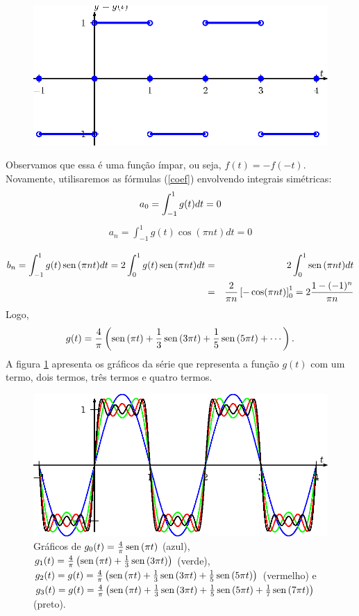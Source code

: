 \begin{ex}
\begin{figure}[!ht]
\begin{center}
\includegraphics{cap_series/pics/figura_3}\end{center}
\end{figure}
Observamos que essa é uma função ímpar, ou seja, $f(t)=-f(-t)$. Novamente, utilisaremos as fórmulas (\ref{coef}) envolvendo integrais simétricas:
  \begin{equation*}
   a_0= \int_{-1}^{1} g(t) dt=0\\
	\end{equation*}
	\begin{eqnarray*}
   a_n=  \int_{-1}^{1} g(t)\cos(\pi n t)dt=0\\
	 \end{eqnarray*}
	\begin{eqnarray*}
   b_n=\int_{-1}^{1} g(t)\operatorname{sen}\,(\pi n t)dt=2\int_{0}^{1} g(t)\operatorname{sen}\,(\pi n t)dt&=&2\int_{0}^{1} \operatorname{sen}\,(\pi n t)dt\\
	&=&\frac{2}{\pi n}\left[-\cos(\pi n t)\right]_0^1=2\frac{1-(-1)^n}{\pi n}
  \end{eqnarray*}
Logo,
$$
g(t)=\frac{4}{\pi}\left(\operatorname{sen}\,(\pi t)+\frac{1}{3}\operatorname{sen}\,(3\pi t)+\frac{1}{5}\operatorname{sen}\,(5\pi t)+\cdots\right).
$$
A figura \ref{fig_conv_quadrangular} apresenta os gráficos da série que representa a função $g(t)$ com um termo, dois termos, três termos e quatro termos.
\begin{figure}[!ht]
\begin{center}

\includegraphics{cap_series/pics/figura_4}\end{center}
\caption{\label{fig_conv_quadrangular}Gráficos de $g_0(t)=\frac{4}{\pi}\operatorname{sen}\,(\pi t)$ (azul), $g_1(t)=\frac{4}{\pi}\left(\operatorname{sen}\,(\pi t)+\frac{1}{3}\operatorname{sen}\,(3\pi t)\right)$ (verde), $g_2(t)=g(t)=\frac{4}{\pi}\left(\operatorname{sen}\,(\pi t)+\frac{1}{3}\operatorname{sen}\,(3\pi t)+\frac{1}{5}\operatorname{sen}\,(5\pi t)\right)$ (vermelho) e $g_3(t)=g(t)=\frac{4}{\pi}\left(\operatorname{sen}\,(\pi t)+\frac{1}{3}\operatorname{sen}\,(3\pi t)+\frac{1}{5}\operatorname{sen}\,(5\pi t)+\frac{1}{7}\operatorname{sen}\,(7\pi t)\right)$ (preto).}
\end{figure}
\end{ex}
